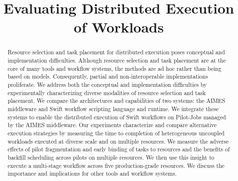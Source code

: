 \documentclass[10pt, conference, compsocconf]{IEEEtran}
\begin{document}
\title{Evaluating Distributed Execution of Workloads}



\author{
}

\maketitle

\begin{abstract}
Resource selection and task placement for distributed execution poses conceptual
and implementation difficulties. Although resource selection and task placement
are at the core of many tools and workflow systems, the methods are ad hoc
rather than being based on models. Consequently, partial and non-interoperable
implementations proliferate. We address both the conceptual and implementation
difficulties by experimentally characterizing diverse modalities of resource
selection and task placement. We compare the architectures and capabilities of
two systems: the AIMES middleware and Swift workflow scripting language and
runtime.  We integrate these systems to enable the distributed execution of
Swift workflows on Pilot-Jobs managed by the AIMES middleware. Our experiments
characterize and compare alternative execution strategies by measuring the time
to completion of heterogeneous uncoupled workloads executed at diverse scale and
on multiple resources. We measure the adverse effects of pilot fragmentation and
early binding of tasks to resources and the benefits of backfill scheduling
across pilots on multiple resources. We then use this insight to execute a
multi-stage workflow across five production-grade resources. We discuss the
importance and implications for other tools and workflow systems.
\end{abstract}
\end{document}
